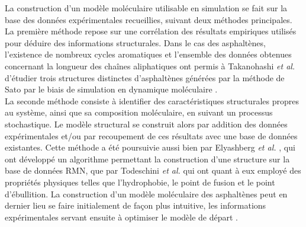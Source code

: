 La construction d'un modèle moléculaire utilisable en simulation se fait sur la base des données expérimentales recueillies, suivant deux méthodes principales. \\
La première méthode repose sur une corrélation des résultats empiriques utilisés pour déduire des informations structurales. Dans le cas des asphaltènes, l'existence de nombreux cycles aromatiques et l'ensemble des données obtenues concernant la longueur des chaînes aliphatiques ont permis à Takanohashi \textit{et al.} d'étudier trois structures distinctes d'asphaltènes générées par la méthode de Sato par le biais de simulation en dynamique moléculaire \cite{takanohashi2004structural}. \\
La seconde méthode consiste à identifier des caractéristiques structurales propres au système, ainsi que sa composition moléculaire, en suivant un processus stochastique. Le modèle structural se construit alors par addition des données expérimentales et/ou par recoupement de ces résultats avec une base de données existantes. Cette méthode a été poursuivie aussi bien par Elyashberg \textit{et al.} \cite{elyashberg2008computer}, qui ont développé un algorithme permettant la construction d'une structure sur la base de données RMN, que par Todeschini \textit{et al.} \cite{todeschini1995weighted} qui ont quant à eux employé des propriétés physiques telles que l'hydrophobie, le point de fusion et le point d'ébullition. 
La construction d'un modèle moléculaire des asphaltènes peut en dernier lieu se faire initialement de façon plus intuitive, les informations expérimentales servant ensuite à optimiser le modèle de départ \cite{faulon1996stochastic,al2012systematic,de2012monte}. 





